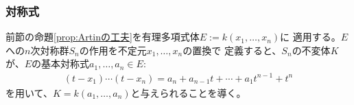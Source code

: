 {\subsubsection{対称式}\label{s3:対称式} %
	\begin{minipage}{0.9\hsize}{\small
	前節の命題\ref{prop:Artinの工夫}を有理多項式体$E:=k(x_1,\dots,x_n)$に
	適用する。$E$への$n$次対称群$S_n$の作用を不定元$x_1,\dots,x_n$の置換で
	定義すると、$S_n$の不変体$K$が、$E$の基本対称式$a_1,\dots,a_n\in E$:
	\begin{equation*}\begin{split}
		(t-x_1)\cdots(t-x_n) = a_n + a_{n-1}t +\cdots+ a_1t^{n-1} + t^n
	\end{split}\end{equation*}
	を用いて、$K=k(a_1,\dots,a_n)$と与えられることを導く。
	}\end{minipage}\medskip

}
